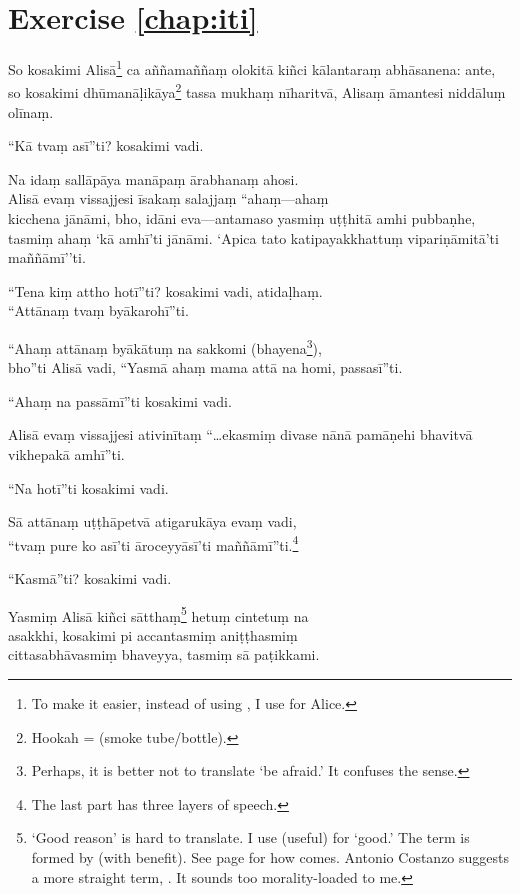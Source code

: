 \section*{Exercise \ref{chap:iti}}
\begin{answerkey}
\item So kosakimi Alis\=a\footnote{To make it easier, instead of using , I use  for Alice.} ca a\~n\~nama\~n\~na\d m olokit\=a ki\~nci k\=alantara\d m abh\=asanena: ante, so kosakimi dh\=uman\=a\d lik\=aya\footnote{Hookah =  (smoke tube/bottle).} tassa mukha\d m n\=iharitv\=a, Alisa\d m \=amantesi nidd\=alu\d m ol\=ina\d m.
\item ``K\=a tva\d m as\=i''ti? kosakimi vadi.
\item Na ida\d m sall\=ap\=aya man\=apa\d m \=arabhana\d m ahosi. \\Alis\=a eva\d m vissajjesi \=isaka\d m salajja\d m ``aha\d m---aha\d m \\kicchena j\=an\=ami, bho, id\=ani eva---antamaso yasmi\d m u\d t\d thit\=a amhi pubba\d nhe, tasmi\d m aha\d m `k\=a amh\=i'ti j\=an\=ami. `Apica tato katipayakkhattu\d m vipari\d n\=amit\=a'ti ma\~n\~n\=am\=i''ti.
\item ``Tena ki\d m attho hot\=i''ti? kosakimi vadi, atida\d lha\d m. \\``Att\=ana\d m tva\d m by\=akaroh\=i''ti.
\item ``Aha\d m att\=ana\d m by\=ak\=atu\d m na sakkomi (bhayena\footnote{Perhaps, it is better not to translate `be afraid.' It confuses the sense.}), \\bho''ti Alis\=a vadi, ``Yasm\=a aha\d m mama att\=a na homi, passas\=i''ti.
\item ``Aha\d m na pass\=am\=i''ti kosakimi vadi.
\item Alis\=a eva\d m vissajjesi ativin\=ita\d m ``\ldots ekasmi\d m divase n\=an\=a pam\=a\d nehi bhavitv\=a vikhepak\=a amh\=i''ti.
\item ``Na hot\=i''ti kosakimi vadi.
\item S\=a att\=ana\d m u\d t\d th\=apetv\=a atigaruk\=aya eva\d m vadi, \\``tva\d m pure ko as\=i'ti \=aroceyy\=as\=i'ti ma\~n\~n\=am\=i''ti.\footnote{The last part has three layers of speech.}
\item ``Kasm\=a''ti? kosakimi vadi.
\item Yasmi\d m Alis\=a ki\~nci s\=attha\d m\footnote{`Good reason' is hard to translate. I use  (useful) for `good.' The term is formed by  (with benefit). See page \pageref{upasagga:sadm} for how  comes. Antonio Costanzo suggests a more straight term, . It sounds too morality-loaded to me.} hetu\d m cintetu\d m na \\asakkhi, kosakimi pi accantasmi\d m ani\d t\d thasmi\d m \\cittasabh\=avasmi\d m bhaveyya, tasmi\d m s\=a pa\d tikkami.

\end{answerkey}
